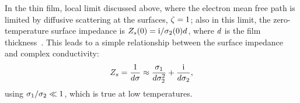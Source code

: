 In the thin film, local limit discussed above, where the electron mean free path is limited by diffusive scattering at the surfaces,
$\zeta = 1$; also in this limit, the zero-temperature surface impedance is
$Z_s(0) = \mathrm{i} / \sigma_2(0) d$,
where $d$ is the film thickness~\autocite{Zmuidzinas2012ARCMP}.
This leads to a simple relationship between the surface impedance and complex conductivity:
\begin{equation}
Z_s
  =
  \frac{1}{d \sigma}
  \approx
  \frac{\sigma_1}{d \sigma_2^2}
  + \frac{\mathrm{i}}{d \sigma_2},
\end{equation}
using $\sigma_1 / \sigma_2 \ll 1$, which is true at low temperatures.


